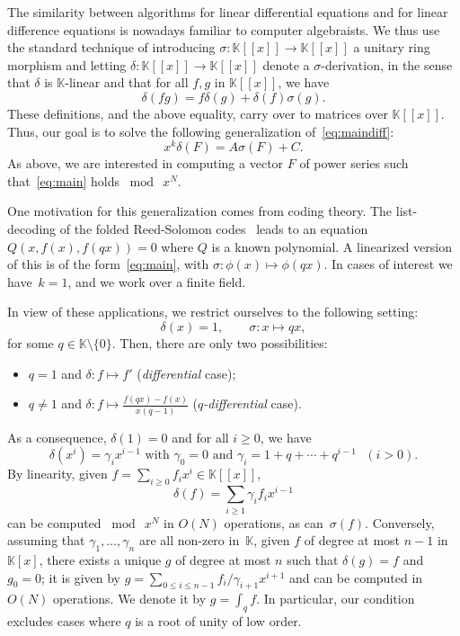 \documentclass[]{sig-alternate}
\def\partial{\delta}
\def\K {\ensuremath{\mathbb{K}}}
\def\I {\ensuremath{\int_q}}
\def\mA {\ensuremath{{A}}}
\def\mC {\ensuremath{{C}}}
\def\mF {\ensuremath{{F}}}
\begin{document}
\smallskip{}  The similarity between
algorithms for linear differential equations and for linear difference
equations is nowadays familiar to computer algebraists. We thus use
the standard technique of introducing $\sigma:\K[[x]] \to \K[[x]]$ a
unitary ring morphism and letting $\partial:\K[[x]] \to \K[[x]]$
denote a $\sigma$-derivation, in the sense that $\partial$ is
$\K$-linear and that for all $f,g$ in $\K[[x]]$, we have
$$\partial(fg)=f\partial(g)+\partial(f)\sigma(g).$$ These definitions,
and the above equality, carry over to matrices over $\K[[x]]$. Thus,
our goal is to solve the following generalization
of~\eqref{eq:maindiff}:
\begin{equation}\label{eq:main}
x^k \partial(\mF) = \mA \sigma(\mF) + \mC.
\end{equation}
As above, we are interested in computing a vector $\mF$ of power
series such that~\eqref{eq:main} holds  $\bmod~x^N$.

One motivation for this generalization comes from coding theory. The
list-decoding of the folded Reed-Solomon
codes~\cite{GuruswamiRudra2008} leads to an equation
$Q(x,f(x),f(qx))=0$ where $Q$ is a known polynomial. A linearized
version of this is of the form~\eqref{eq:main}, with
$\sigma:\phi(x)\mapsto\phi(qx)$. In cases of interest we have~$k=1$,
and we work over a finite field.

In view of these applications, we restrict ourselves to the following
setting:
\[\partial(x)=1,\qquad \sigma: x \mapsto qx,\]
for some $q \in \K\setminus\{0\}$. Then, there are only two possibilities:
\begin{itemize}
\item $q=1$ and $\partial:f\mapsto f'$
   ({\em differential} case);
\item $q \ne 1$ and $\partial:f\mapsto\frac{f(qx)-f(x)}{x(q-1)}$ 
  ({\em $q$-differential} case). 
\end{itemize}
As a consequence, $\partial(1)=0$ and for all $i\ge0$, we have
\[\partial(x^i)=\gamma_i x^{i-1}\text{ with }
\gamma_0=0\text{ and }\gamma_i=1+q+\cdots+q^{i-1}\text{ $(i>0)$}.\]
By linearity, given $f=\sum_{i \ge 0} f_i x^i\in\K[[x]]$, 
$$\partial(f)=\sum_{i \ge 1} \gamma_if_i x^{i-1}$$ can be computed
$\bmod~x^N$ in $O(N)$ operations, as can~$\sigma(f)$.  Conversely,
assuming that $\gamma_1,\dots,\gamma_n$ are all non-zero in~$\K$,
given $f$ of degree at most $n-1$ in $\K[x]$, there exists a unique
$g$ of degree at most $n$ such that $\partial(g)=f$ and $g_0=0$; it is
given by $g=\sum_{0 \le i \le n-1} f_i/\gamma_{i+1} x^{i+1}$ and can
be computed in~$O(N)$ operations. We denote it by $g=\I f$. In
particular, our condition excludes cases where $q$ is a root of unity
of low order.
\end{document}
